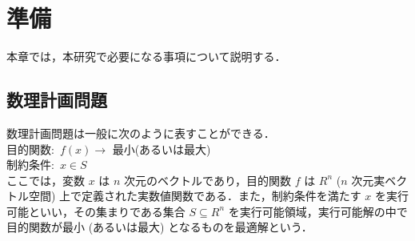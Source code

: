 \documentclass[a4paper,12pt,fleqn]{jarticle}
\begin{document}

\newpage
\section{準備}
本章では，本研究で必要になる事項について説明する．
\subsection{数理計画問題}
数理計画問題\cite{数理計画入門}は一般に次のように表すことができる．\\
\hspace{3.0cm}目的関数:\ $f(x)$\hspace{0.2cm}$\rightarrow$\hspace{0.2cm} 最小(あるいは最大)\\
\hspace{3.0cm}制約条件:\ $x \in S$\\
ここでは，変数 $x$ は $n$ 次元のベクトルであり，目的関数 $f$ は $R^n$ ($n$ 次元実ベクトル空間) 上で定義された実数値関数である．また，制約条件を満たす $x$ を実行可能といい，その集まりである集合 $S \subseteq R^n$ を実行可能領域，実行可能解の中で目的関数が最小 (あるいは最大) となるものを最適解という．
\end{document}
